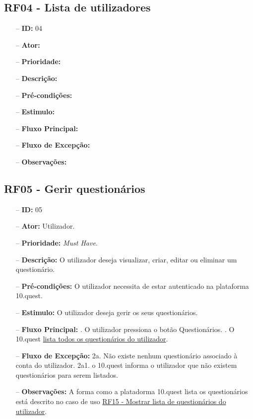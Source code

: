 \subsection{RF04 - Lista de utilizadores}
\begin{itemize}
	\item[--] \textbf{ID:} 04
	\item[--]  \textbf{Ator:} 
	\item[--]  \textbf{Prioridade:}
	\item[--]  \textbf{Descrição:} 
	\item[--]  \textbf{Pré-condições:} 
	\item[--]  \textbf{Estimulo:}
	\item[--]  \textbf{Fluxo Principal:} 
		\subitem
		\subitem
		\subitem
		\subitem
	\item[--]  \textbf{Fluxo de Excepção:} 
		\subitem
		\subitem
		\subitem
		\subitem
	\item[--]  \textbf{Observações:} 
\end{itemize}
\newpage

\subsection{RF05 - Gerir questionários}
\begin{itemize}
	\item[--] \textbf{ID:} 05
	\item[--]  \textbf{Ator:} Utilizador.
	\item[--]  \textbf{Prioridade:} \textit{Must Have}.
	\item[--]  \textbf{Descrição:} O utilizador deseja visualizar, criar, editar ou eliminar um questionário.
	\item[--]  \textbf{Pré-condições:} O utilizador necessita de estar autenticado na plataforma 10.quest.
	\item[--]  \textbf{Estimulo:} O utilizador deseja gerir os seus questionários.
	\item[--]  \textbf{Fluxo Principal:} 
		. O utilizador pressiona o botão Questionários.
		. O 10.quest  \underline{lista todos os questionários do utilizador}.
	\item[--]  \textbf{Fluxo de Excepção:} 
		\subitem 2a. Não existe nenhum questionário associado à conta do utilizador.
		\subitem 2a1. o 10.quest informa o utilizador que não existem questionários para serem listados.
	\item[--]  \textbf{Observações:} A forma como a platadorma 10.quest lista os questionários está descrito no caso de uso \underline{RF15 - Mostrar lista de questionários do utilizador}.
\end{itemize}
\newpage


